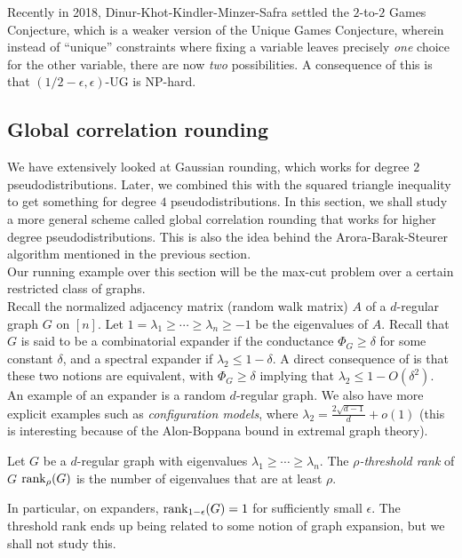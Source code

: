 		Recently in 2018, Dinur-Khot-Kindler-Minzer-Safra \cite{2-2-gc} settled the $2$-to-$2$ Games Conjecture, which is a weaker version of the Unique Games Conjecture, wherein instead of ``unique'' constraints where fixing a variable leaves precisely \emph{one} choice for the other variable, there are now \emph{two} possibilities. A consequence of this is that $(1/2-\epsilon,\epsilon)$-UG is \textsf{NP}-hard.


\subsection{Global correlation rounding}

	We have extensively looked at Gaussian rounding, which works for degree $2$ pseudodistributions. Later, we combined this with the squared triangle inequality to get something for degree $4$ pseudodistributions. In this section, we shall study a more general scheme called global correlation rounding that works for higher degree pseudodistributions. This is also the idea behind the Arora-Barak-Steurer algorithm mentioned in the previous section.\\
	Our running example over this section will be the max-cut problem over a certain restricted class of graphs.\\

	Recall the normalized adjacency matrix (random walk matrix) $A$ of a $d$-regular graph $G$ on $[n]$. Let $1 = \lambda_1 \ge \cdots \ge \lambda_n \ge -1$ be the eigenvalues of $A$. Recall that $G$ is said to be a combinatorial expander if the conductance $\Phi_G \ge \delta$ for some constant $\delta$, and a spectral expander if $\lambda_2 \le 1-\delta$. A direct consequence of  is that these two notions are equivalent, with $\Phi_G \ge \delta$ implying that $\lambda_2 \le 1 - O(\delta^2)$.\\
	An example of an expander is a random $d$-regular graph. We also have more explicit examples such as \emph{configuration models}, where $\lambda_2 = \frac{2\sqrt{d-1}}{d} + o(1)$ (this is interesting because of the Alon-Boppana bound in extremal graph theory).

	\begin{fdef}
		Let $G$ be a $d$-regular graph with eigenvalues $\lambda_1 \ge \cdots \ge \lambda_n$. The \emph{$\rho$-threshold rank} of $G$ $\operatorname{rank}_\rho(G)$ is the number of eigenvalues that are at least $\rho$.
	\end{fdef}
	In particular, on expanders, $\operatorname{rank}_{1-\epsilon}(G) = 1$ for sufficiently small $\epsilon$. The threshold rank ends up being related to some notion of graph expansion, but we shall not study this.
	
